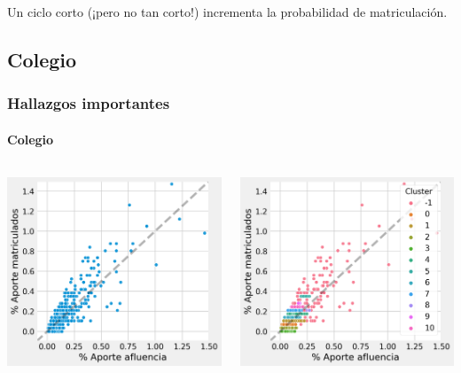 \documentclass[aspectratio=149]{beamer}
\begin{document}
\begin{frame}
\begin{columns}
\begin{column}{0.46\textwidth}
		\end{column}
	\end{columns}
	\vspace{0.5cm}
	Un ciclo corto (¡pero no tan corto!) incrementa la probabilidad de matriculación.
\end{frame}

\subsection{Colegio}
\begin{frame}
	\frametitle{Hallazgos importantes}
	\framesubtitle{Colegio}
	\begin{columns}
		\begin{column}{0.52\textwidth}
			\centering
			\includegraphics[width=\textwidth]{colegios.png} \\
		\end{column}
		\begin{column}{0.52\textwidth}
			\centering
			\includegraphics[width=\textwidth]{colegios-cluster.png} \\

\end{column}
\end{columns}
\end{frame}
\end{document}

